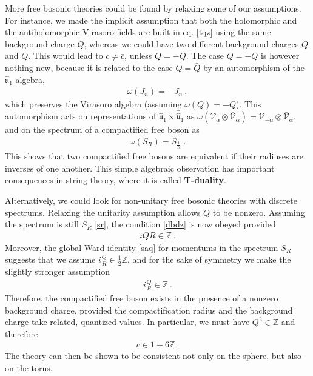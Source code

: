 \documentclass[12pt,a4paper,notitlepage]{report}
\numberwithin{equation}{section}
\theoremstyle{break}
\begin{document}
More free bosonic theories could be found by relaxing some of our assumptions.
For instance, we made the implicit assumption that both the holomorphic and the antiholomorphic Virasoro fields are built in eq. \eqref{tqz} using the same background charge $Q$, whereas we could have two different background charges $Q$ and $\bar{Q}$.
This would lead to $c\neq \bar{c}$, unless $Q=- \bar{Q}$. 
The case $Q=-\bar{Q}$ is however nothing new, because it is related to the case $Q=\bar{Q}$ by an automorphism of the $\hat{\mathfrak{u}}_1$ algebra,
\begin{align}
 \omega(J_n) = -J_n \ ,
\end{align}
which preserves the Virasoro algebra (assuming $\omega(Q)=-Q$).
This automorphism acts on representations of $\hat{\mathfrak{u}}_1 \times \bar{\hat{\mathfrak{u}}}_1$ as $\omega(\mathcal{V}_\alpha \otimes \bar{\mathcal{V}}_{\bar{\alpha}}) =  \mathcal{V}_{-\alpha} \otimes \bar{\mathcal{V}}_{\bar{\alpha}}$, and on the spectrum of a compactified free boson as 
\begin{align}
 \omega(S_R) = S_{\frac{1}{R}}\ .
\end{align}
This shows that two compactified free bosons are equivalent if their radiuses are inverses of one another.
This simple algebraic observation has important consequences in string theory, where it is called \textbf{\boldmath T-duality}. 

Alternatively, we could look for non-unitary free bosonic theories with discrete spectrums.
Relaxing the unitarity assumption allows $Q$ to be nonzero.
Assuming the spectrum is still $S_R$ \eqref{sr}, the condition \eqref{dbdz} is now obeyed provided 
\begin{align}
 iQR\in {\mathbb{Z}} \ .
\end{align}
Moreover, the global Ward identity \eqref{saq} for momentums in the spectrum $S_R$ suggests that we assume $i\frac{Q}{R}\in \frac12 {\mathbb{Z}}$, and for the sake of symmetry we make the slightly stronger assumption
\begin{align}
 i\frac{Q}{R}\in {\mathbb{Z}} \ .
\end{align}
Therefore, the compactified free boson exists in the presence of a nonzero background charge, provided the compactification radius 
and the background charge take related, quantized values.
In particular, we must have $Q^2\in {\mathbb{Z}}$ and therefore 
\begin{align}
 c\in 1+6{\mathbb{Z}}\ .
\end{align}
The theory can then be shown to be consistent not only on the sphere, but also on the torus.
\end{document}
